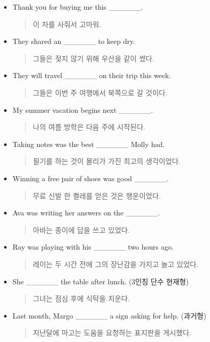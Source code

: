 \documentclass{article}
\begin{document}
\begin{addmargin}[1em]{1em}
\begin{itemize}
\begin{quote}
    \end{quote}
    \item Thank you for buying me this \_\_\_\_\_\_.
    \begin{quote}
    이 차를 사줘서 고마워.
    \end{quote}
    \newpage
    \item They shared an \_\_\_\_\_\_ to keep dry.
    \begin{quote}
    그들은 젖지 않기 위해 우산을 같이 썼다.
    \end{quote}
    \item They will travel \_\_\_\_\_\_ on their trip this week.
    \begin{quote}
    그들은 이번 주 여행에서 북쪽으로 갈 것이다.
    \end{quote}
    \item My summer vacation begins next \_\_\_\_\_\_.
    \begin{quote}
    나의 여름 방학은 다음 주에 시작된다.
    \end{quote}
    \item Taking notes was the best \_\_\_\_\_\_ Molly had.
    \begin{quote}
    필기를 하는 것이 몰리가 가진 최고의 생각이었다.
    \end{quote}
    \item Winning a free pair of shoes was good \_\_\_\_\_\_.
    \begin{quote}
    무료 신발 한 켤레를 얻은 것은 행운이었다.
    \end{quote}
    \item Ava was writing her answers on the \_\_\_\_\_\_.
    \begin{quote}
    아바는 종이에 답을 쓰고 있었다.
    \end{quote}
    \item Ray was playing with his \_\_\_\_\_\_ two hours ago.
    \begin{quote}
    레이는 두 시간 전에 그의 장난감을 가지고 놀고 있었다.
    \end{quote}
    \item She \_\_\_\_\_\_ the table after lunch. (3인칭 단수 현재형)
    \begin{quote}
    그녀는 점심 후에 식탁을 치운다.
    \end{quote}
    \item Last month, Margo \_\_\_\_\_\_ a sign asking for help. (과거형)
    \begin{quote}
    지난달에 마고는 도움을 요청하는 표지판을 게시했다.

\end{quote}
\end{itemize}
\end{addmargin}
\end{document}
